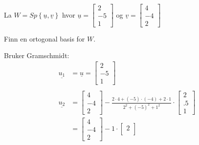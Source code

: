 \documentclass[11pt, a4paper, norsk]{NTNUoving}
\begin{document}
    \begin{oppgave}
        La $W = Sp\left\{\underline{u}, \underline{v}\right\}$ hvor $\underline{u} = \begin{bmatrix}
            2 \\
            -5 \\
            1
        \end{bmatrix}$ og $\underline{v} = \begin{bmatrix}
            4 \\
            -4 \\
            2
        \end{bmatrix}$
        \begin{punkt}
            Finn en ortogonal basis for $W$.

            Bruker Gramschmidt:
            \begin{align*}
                \underline{u_1} &= \underline{u} = \begin{bmatrix}
                    2 \\
                    -5 \\
                    1
                \end{bmatrix}
                \\
                \\
                    \underline{u_2} &= \begin{bmatrix}
                        4 \\
                        -4 \\
                        2
                    \end{bmatrix} - \frac{2 \cdot 4 + (-5) \cdot (-4) + 2 \cdot 1}{2^2 + (-5)^2 + 1^2} \cdot \begin{bmatrix}
                        2 \\
                        .5 \\
                        1
                    \end{bmatrix}
                    \\
                                    &= \begin{bmatrix}
                                        4 \\
                                        -4 \\
                                        2
                                    \end{bmatrix} - 1 \cdot \begin{bmatrix}
                                        2 \\

\end{bmatrix}
\end{align*}
\end{punkt}
\end{oppgave}
\end{document}
